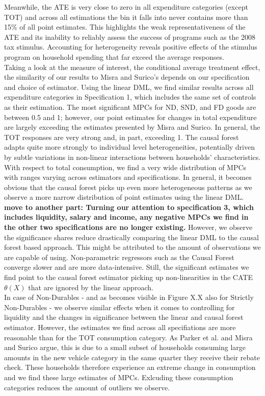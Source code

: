 Meanwhile, the ATE is very close to zero in all expenditure categories (except TOT) and across all estimations the bin it falls into never contains more than 15\% of all point estimates. This highlights the weak representativeness of the ATE and its inability to reliably assess the success of programs such as the 2008 tax stimulus. Accounting for heterogeneity reveals positive effects of the stimulus program on household spending that far exceed the average responses. \\
Taking a look at the measure of interest, the conditional average treatment effect, the similarity of our results to Misra and Surico's depends on our specification and choice of estimator. Using the linear DML, we find similar results across all expenditure categories in Specification 1, which includes the same set of controls as their estimation. The most significant MPCs for ND, SND, and FD goods are between 0.5 and 1; however, our point estimates for changes in total expenditure are largely exceeding the estimates presented by Misra and Surico. In general, the TOT responses are very strong and, in part, exceeding 1. The causal forest adapts quite more strongly to individual level heterogeneities, potentially driven by subtle variations in non-linear interactions between households’ characteristics. \\
With respect to total consumption, we find a very wide distribution of MPCs with ranges varying across estimators and specifications. In general, it becomes obvious that the causal forest picks up even more heterogeneous patterns as we observe a more narrow distribution of point estimates using the linear DML. \textbf{move to another part: Turning our attention to specification 3, which includes liquidity, salary and income, any negative MPCs we find in the other two specifications are no longer existing.} However, we observe the significance shares reduce drastically comparing the linear DML to the causal forest based approach. This might be attributed to the amount of observations we are capable of using. Non-parametric regressors such as the Causal Forest converge slower and are more data-intensive. Still, the significant estimates we find point to the causal forest estimator picking up non-linearities in the CATE $\theta(X)$ that are ignored by the linear approach. \\
In case of Non-Durables - and as becomes visible in Figure X.X also for Strictly Non-Durables - we observe similar effects when it comes to controlling for liquidity and the changes in significance between the linear and causal forest estimator. However, the estimates we find across all specifiations are more reasonable than for the TOT consumption category. As Parker et al. and Misra and Surico argue, this is due to a small subset of households consuming large amounts in the new vehicle category in the same quarter they receive their rebate check. These households therefore experience an extreme change in consumption and we find these large estimates of MPCs. Exlcuding these consumption categories reduces the amount of outliers we observe. \\
